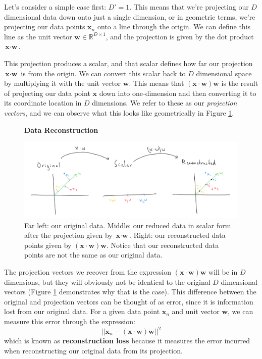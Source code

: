 Let's consider a simple case first: $D'=1$. This means that we're projecting our $D$ dimensional data down onto just a single dimension, or in geometric terms, we're projecting our data points $\textbf{x}_{n}$ onto a line through the origin. We can define this line as the unit vector $\textbf{w} \in \mathbb{R}^{D \times 1}$, and the projection is given by the dot product $\textbf{x} \cdot \textbf{w}$.


This projection produces a scalar, and that scalar defines how far our projection $\textbf{x} \cdot \textbf{w}$ is from the origin. We can convert this scalar back to $D$ dimensional space by multiplying it with the unit vector $\textbf{w}$. This means that $(\textbf{x} \cdot \textbf{w})\textbf{w}$ is the result of projecting our data point $\textbf{x}$ down into one-dimension and then converting it to its coordinate location in $D$ dimensions. We refer to these as our \textit{projection vectors}, and we can observe what this looks like geometrically in Figure \ref{fig:data-reconstruction}.

\begin{figure}
    \centering
    \textbf{Data Reconstruction}\par\medskip
    \includegraphics[width=0.5\paperwidth]{../DimensionalityReduction/fig/data-reconstruction.png}
    \caption{Far left: our original data. Middle: our reduced data in scalar form after the projection given by $\textbf{x} \cdot \textbf{w}$. Right: our reconstructed data points given by $(\textbf{x} \cdot \textbf{w})\textbf{w}$. Notice that our reconstructed data points are not the same as our original data.}
    \label{fig:data-reconstruction}
\end{figure}

The projection vectors we recover from the expression $(\textbf{x} \cdot \textbf{w})\textbf{w}$ will be in $D$ dimensions, but they will obviously not be identical to the original $D$ dimensional vectors (Figure \ref{fig:data-reconstruction} demonstrates why that is the case). This difference between the original and projection vectors can be thought of as error, since it is information lost from our original data. For a given data point $\textbf{x}_{n}$ and unit vector $\textbf{w}$, we can measure this error through the expression:
\begin{equation} \label{reconstruction-loss}
	||\textbf{x}_{n} - (\textbf{x} \cdot \textbf{w})\textbf{w}||^{2}
\end{equation}
which is known as \textbf{reconstruction loss} because it measures the error incurred when reconstructing our original data from its projection. 

